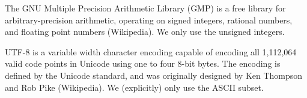 
The GNU Multiple Precision Arithmetic Library (GMP) is a free library for 
arbitrary-precision arithmetic, operating on signed integers, rational 
numbers, and floating point numbers (Wikipedia). We only use the unsigned 
integers. 

UTF-8 is a variable width character encoding capable of encoding all 
1,112,064 valid code points in Unicode using one to four 8-bit bytes. The 
encoding is defined by the Unicode standard, and was originally designed 
by Ken Thompson and Rob Pike (Wikipedia). We (explicitly) only use the 
ASCII subset. 

